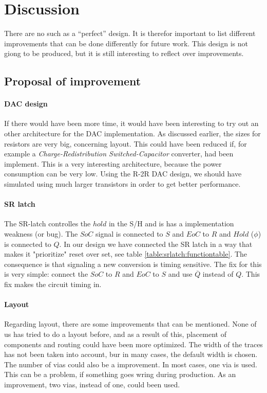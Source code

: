 \documentclass[english, 12pt, a4paper]{ifimaster}
\begin{document}
\chapter{Discussion}
There are no such as a ``perfect'' design. It is therefor important to list different improvements that
can be done differently for future work. This design is not giong to be produced, but it is still 
interesting to reflect over improvements. 

\section{Proposal of improvement}
\subsubsection{DAC design}
If there would have been more time, it would have been interesting to try out an other architecture
for the DAC implementation. As discussed earlier, the sizes for resistors are very big, concerning
layout. This could have been reduced if, for example a \textit{Charge-Redistribution Switched-Capacitor} 
converter, had been implement. This is a very interesting architecture, because the power consumption
can be very low. 
Using the R-2R DAC design, we should have simulated using much larger transistors in order to get better performance.

\subsubsection{SR latch}
The SR-latch controlles the \(hold\) in the S/H and is has a implementation weakness (or bug). The \(SoC\) signal is connected to \(S\) and \(EoC\) to  \(R\) and \(Hold\) (\(\phi\)) is connected to \(Q\). 
In our design we have connected the SR latch in a way that makes it "prioritize" reset over set, see table \ref{table:srlatch:functiontable}.
The consequence is that signaling a new conversion is timing sensitive.
The fix for this is very simple: connect the \(SoC\) to \(R\) and \(EoC\) to \(S\) and use \(\overline{Q}\) instead of \(Q\). This fix makes the circuit timing in.

\subsubsection{Layout}
Regarding layout, there are some improvements that can be mentioned. None of us has tried to do a layout before, and as a result of this, placement of components and 
routing could have been more optimized. The width of the traces has not been taken into account, bur in many cases, the default width is chosen. The number of vias could also be a 
improvement. In most cases, one via is used. This can be a problem, if something goes wring during production. As an improvement, two vias, instead of one, could been used. 
\end{document}
